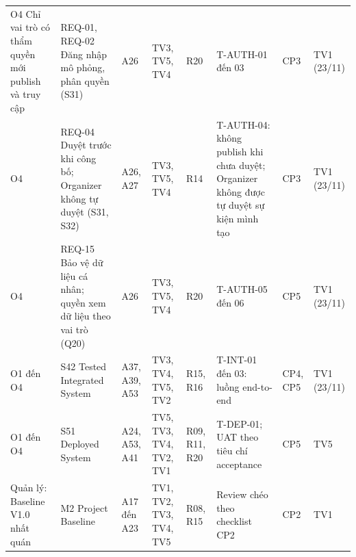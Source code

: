 \begin{landscape}
\begin{longtable}{L{3.0cm}L{4.0cm}L{1.5cm}L{1.7cm}L{1.3cm}L{4.3cm}L{1.3cm}L{1.3cm}}
O4 Chỉ vai trò có thẩm quyền mới publish và truy cập & REQ-01, REQ-02 Đăng nhập mô phỏng, phân quyền (S31) & A26 & TV3, TV5, TV4 & R20 & T-AUTH-01 đến 03 & CP3 & TV1 (23/11) \\
O4 & REQ-04 Duyệt trước khi công bố; Organizer không tự duyệt (S31, S32) & A26, A27 & TV3, TV5, TV4 & R14 & T-AUTH-04: không publish khi chưa duyệt; Organizer không được tự duyệt sự kiện mình tạo & CP3 & TV1 (23/11) \\
O4 & REQ-15 Bảo vệ dữ liệu cá nhân; quyền xem dữ liệu theo vai trò (Q20) & A26 & TV3, TV5, TV4 & R20 & T-AUTH-05 đến 06 & CP5 & TV1 (23/11) \\
O1 đến O4 & S42 Tested Integrated System & A37, A39, A53 & TV3, TV4, TV5, TV2 & R15, R16 & T-INT-01 đến 03: luồng end-to-end & CP4, CP5 & TV1 (23/11) \\
O1 đến O4 & S51 Deployed System & A24, A53, A41 & TV5, TV3, TV4, TV2, TV1 & R09, R11, R20 & T-DEP-01; UAT theo tiêu chí acceptance & CP5 & TV5 \\
Quản lý: Baseline V1.0 nhất quán & M2 Project Baseline & A17 đến A23 & TV1, TV2, TV3, TV4, TV5 & R08, R15 & Review chéo theo checklist CP2 & CP2 & TV1 \\
\end{longtable}
\endgroup
\end{landscape}
